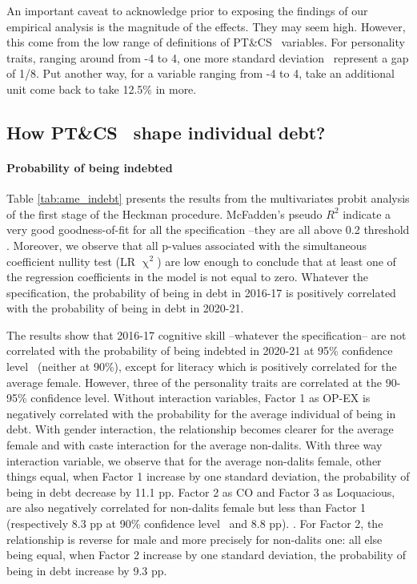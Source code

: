 \documentclass[a4paper, 11pt, onecolumn]{article}
\newcommand{\sd}{standard deviation}
\newcommand{\aebe}{all else being equal}
\newcommand{\ote}{other things equal}
\newcommand{\cl}{confidence level}
\newcommand{\lit}{\dev{literature}}
\newcommand{\PTCS}{PT\&CS}
\begin{document}
An important caveat to acknowledge prior to exposing the findings of our empirical analysis is the magnitude of the effects.
They may seem high. 
However, this come from the low range of definitions of \PTCS~ variables.
For personality traits, ranging around from -4 to 4, one more \sd~ represent a gap of 1/8.
Put another way, for a variable ranging from -4 to 4, take an additional unit come back to take 12.5\% in more.

\subsection{How \PTCS~ shape individual debt?}
\paragraph{Probability of being indebted}
Table \ref{tab:ame_indebt} presents the results from the multivariates probit analysis of the first stage of the Heckman procedure.
McFadden's pseudo $R^2$ indicate a very good goodness-of-fit for all the specification --they are all above 0.2 threshold \citep{McFadden1979}.
Moreover, we observe that all p-values associated with the simultaneous coefficient nullity test (LR $\upchi^2$) are low enough to conclude that at least one of the regression coefficients in the model is not equal to zero.
Whatever the specification, the probability of being in debt in 2016-17 is positively correlated with the probability of being in debt in 2020-21. 

The results show that 2016-17 cognitive skill --whatever the specification-- are not correlated with the probability of being indebted in 2020-21 at 95\% \cl~ (neither at 90\%), except for literacy which is positively correlated for the average female.
However, three of the personality traits are correlated at the 90-95\% \cl. 
Without interaction variables, Factor 1 as OP-EX is negatively correlated with the probability for the average individual of being in debt.
With gender interaction, the relationship becomes clearer for the average female and with caste interaction for the average non-dalits.
With three way interaction variable, we observe that for the average non-dalits female, \ote, when Factor 1 increase by one \sd, the probability of being in debt decrease by 11.1 pp.
Factor 2 as CO and Factor 3 as Loquacious, are also negatively correlated for non-dalits female but less than Factor 1 (respectively 8.3 pp at 90\% \cl~ and 8.8 pp).
\lit.
For Factor 2, the relationship is reverse for male and more precisely for non-dalits one: \aebe, when Factor 2 increase by one \sd, the probability of being in debt increase by 9.3 pp.
\end{document}
